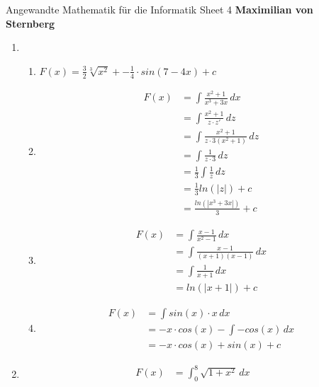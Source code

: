 \documentclass[]{book}
\theoremstyle{definition}
\begin{document}
\begin{center}
{\Large Angewandte Mathematik für die Informatik \hspace{0.5cm} Sheet 4}
\textbf{Maximilian von Sternberg} %
\end{center}

\vspace{0.2 cm}

\begin{enumerate}
    \item \begin{enumerate}
        \item $F(x) = \frac{3}{2}\sqrt[3]{x^2} + -\frac{1}{4}\cdot sin(7 - 4x) + c$
        \item \begin{align*}
            F(x)& = \int \frac{x^2 + 1}{x^3 + 3x} \,dx \\
            & = \int \frac{x^2 + 1}{z \cdot z'} \,dz \\
            & = \int \frac{x^2 + 1}{z \cdot 3(x^2 + 1)} \,dz \\
            & = \int \frac{1}{z \cdot 3} \,dz \\
            & = \frac{1}{3} \int \frac{1}{z} \,dz \\
            & = \frac{1}{3} ln(|z|) + c \\
            & = \frac{ln(|x^3 + 3x|)}{3} + c
        \end{align*}
        \item \begin{align*}
            F(x)& = \int \frac{x - 1}{x^2 - 1} \,dx \\
            & = \int \frac{x-1}{(x+1)(x-1)} \,dx \\
            & = \int \frac{1}{x+1} \,dx \\
            & = ln(|x + 1|) + c
        \end{align*}
        \item \begin{align*}
            F(x)& = \int sin(x) \cdot x \,dx \\
            & = -x \cdot cos(x) - \int -cos(x) \, dx \\
            & = -x \cdot cos(x) + sin(x) + c
        \end{align*}
    \end{enumerate}
    \item \begin{align*}
        F(x)& = \int_0^8 \sqrt{1 + x^2} \,dx \\

\end{align*}
\end{enumerate}
\end{document}
